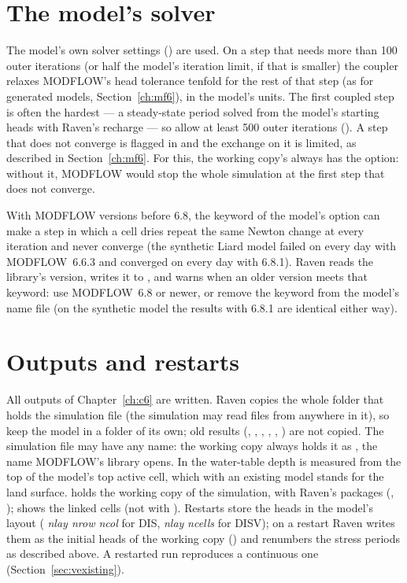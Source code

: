 \section{The model's solver}
The model's own solver settings () are used. On a step that needs more than 100 outer iterations (or half the
model's iteration limit, if that is smaller) the coupler relaxes
MODFLOW's head tolerance tenfold for the rest of that step (as for generated models, Section~\ref{ch:mf6}), in the model's
units. The first coupled step is often the hardest --- a steady-state period solved from the model's starting heads with
Raven's recharge --- so allow at least 500 outer iterations (). A step that does not converge is flagged
in  and the exchange on it is limited, as described in Section~\ref{ch:mf6}. For this, the working copy's
 always has the  option: without it, MODFLOW would stop the whole simulation at the first step
that does not converge.

With MODFLOW versions before 6.8, the  keyword of the model's  option can make a step in
which a cell dries repeat the same Newton change at every iteration and never converge (the synthetic Liard model failed on
every day with MODFLOW~6.6.3 and converged on every day with 6.8.1). Raven reads the library's version, writes it
to , and warns when an older version meets that keyword: use MODFLOW~6.8 or newer, or remove the
keyword from the model's name file (on the synthetic model the results with 6.8.1 are identical either way).

\section{Outputs and restarts}
All outputs of Chapter~\ref{ch:c6} are written. Raven copies the whole folder that holds the simulation file (the simulation
may read files from anywhere in it), so keep the model in a folder of its own; old results (, ,
, , , ) are not copied. The simulation file may have any name: the working copy
always holds it as , the name MODFLOW's library opens. In  the water-table depth is
measured from the top of the model's top active cell, which with an existing model stands for the land surface.  holds the working copy of the simulation, with Raven's packages
(, );  shows the linked cells (not with ).
Restarts store the heads in the model's layout ( \emph{nlay nrow ncol} for DIS, \emph{nlay}  \emph{ncells}
for DISV); on a restart Raven writes them as the initial heads of the working copy () and renumbers the stress
periods as described above. A restarted run reproduces a continuous one (Section~\ref{sec:vexisting}).

